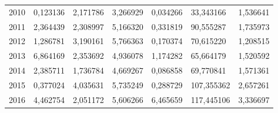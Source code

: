 \begin{table}
\begin{tabular}{p{1cm}p{2cm}p{2cm}p{2cm}p{2cm}p{2cm}p{2cm}}
 2010 &                        0,123136 &                                     2,171786 &  3,266929 &       0,034266 &                      33,343166 &                            1,536641 \\
 2011 &                        2,364439 &                                     2,308997 &  5,166320 &       0,331819 &                      90,555287 &                            1,735973 \\
 2012 &                        1,286781 &                                     3,190161 &  5,766363 &       0,170374 &                      70,615220 &                            1,208515 \\
 2013 &                        6,864169 &                                     2,353692 &  4,936078 &       1,174282 &                      65,664179 &                            1,520592 \\
 2014 &                        2,385711 &                                     1,736784 &  4,669267 &       0,086858 &                      69,770841 &                            1,571361 \\
 2015 &                        0,377024 &                                     4,035631 &  5,735249 &       0,288729 &                     107,355362 &                            2,657261 \\
 2016 &                        4,462754 &                                     2,051172 &  5,606266 &       6,465659 &                     117,445106 &                            3,336697 \\
\bottomrule
\end{tabular}
\end{table}
